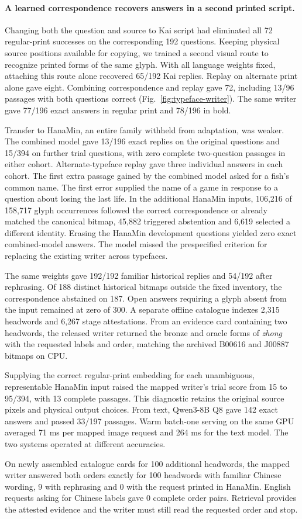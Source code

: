 \paragraph{A learned correspondence recovers answers in a second printed script.}
Changing both the question and source to Kai script had eliminated all 72 regular-print successes on the corresponding 192 questions. Keeping physical source positions available for copying, we trained a second visual route to recognize printed forms of the same glyph. With all language weights fixed, attaching this route alone recovered 65/192 Kai replies. Replay on alternate print alone gave eight. Combining correspondence and replay gave 72, including 13/96 passages with both questions correct (Fig.~\ref{fig:typeface-writer}). The same writer gave 77/196 exact answers in regular print and 78/196 in bold.

Transfer to HanaMin, an entire family withheld from adaptation, was weaker. The combined model gave 13/196 exact replies on the original questions and 15/394 on further trial questions, with zero complete two-question passages in either cohort. Alternate-typeface replay gave three individual answers in each cohort. The first extra passage gained by the combined model asked for a fish's common name. The first error supplied the name of a game in response to a question about losing the last life. In the additional HanaMin inputs, 106,216 of 158,717 glyph occurrences followed the correct correspondence or already matched the canonical bitmap, 45,882 triggered abstention and 6,619 selected a different identity. Erasing the HanaMin development questions yielded zero exact combined-model answers. The model missed the prespecified criterion for replacing the existing writer across typefaces.

The same weights gave 192/192 familiar historical replies and 54/192 after rephrasing. Of 188 distinct historical bitmaps outside the fixed inventory, the correspondence abstained on 187. Open answers requiring a glyph absent from the input remained at zero of 300. A separate offline catalogue indexes 2,315 headwords and 6,267 stage attestations. From an evidence card containing two headwords, the released writer returned the bronze and oracle forms of \textit{zhong} with the requested labels and order, matching the archived B00616 and J00887 bitmaps on CPU.

Supplying the correct regular-print embedding for each unambiguous, representable HanaMin input raised the mapped writer's trial score from 15 to 95/394, with 13 complete passages. This diagnostic retains the original source pixels and physical output choices. From text, Qwen3-8B Q8 gave 142 exact answers and passed 33/197 passages. Warm batch-one serving on the same GPU averaged 71 ms per mapped image request and 264 ms for the text model. The two systems operated at different accuracies.

On newly assembled catalogue cards for 100 additional headwords, the mapped writer answered both orders exactly for 100 headwords with familiar Chinese wording, 9 with rephrasing and 0 with the request printed in HanaMin. English requests asking for Chinese labels gave 0 complete order pairs. Retrieval provides the attested evidence and the writer must still read the requested order and stop.
